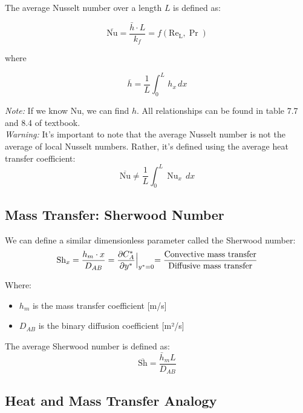 The average Nusselt number over a length $L$ is defined as:
\begin{definition}
    \[
        \overline{\text{Nu}} = \frac{\bar{h}\cdot L}{k_f} = f(\operatorname{Re_L}, \operatorname{Pr})
    \]
\end{definition}
%
where
\begin{definition}
    \[
        \overline{h} = \frac{1}{L}\int_0^L \,h_x\,dx
    \]
\end{definition}
%
\textit{Note:} If we know Nu, we can find $h$. All relationships can be found in table 7.7 and 8.4 of textbook.
\\[0.5em]
\textit{Warning:} It's important to note that the average Nusselt number is not the average of local Nusselt numbers. Rather, it's defined using the average heat transfer coefficient:
\[
    \overline{\text{Nu}} \neq \frac{1}{L}\int_0^L\operatorname{Nu}_x \,dx
\]


\subsection*{Mass Transfer: Sherwood Number}
We can define a similar dimensionless parameter called the Sherwood number:
\[
    \text{Sh}_x = \frac{h_m\cdot x}{D_{AB}} = \frac{\partial C^*_A}{\partial y^*} \Bigl \vert_{y^* =0} = \frac{\text{Convective mass transfer}}{\text{Diffusive mass transfer}}
\]

Where:
\begin{itemize}
    \item $h_m$ is the mass transfer coefficient [m/s]
    \item $D_{AB}$ is the binary diffusion coefficient [m²/s]
\end{itemize}

The average Sherwood number is defined as:
\[
\overline{\text{Sh}} = \frac{\bar{h}_m L}{D_{AB}}
\]
\subsection*{Heat and Mass Transfer Analogy}

